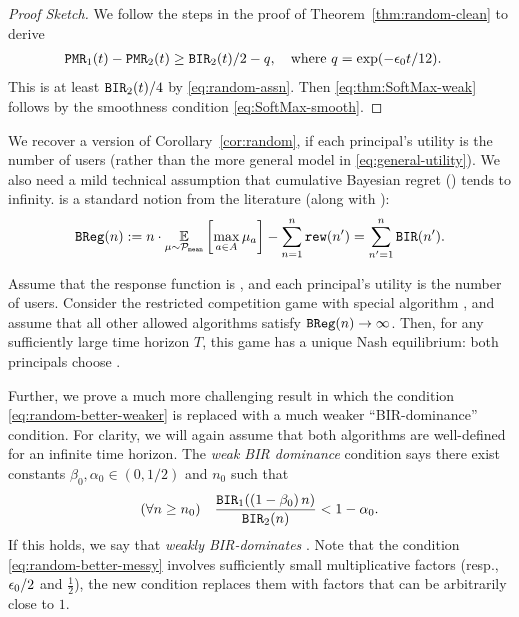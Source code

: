 \begin{proof}[Proof Sketch]
We follow the steps in the proof of Theorem~\ref{thm:random-clean} to derive \begin{align*}
\mathtt{PMR}_1(t) - \mathtt{PMR}_2(t)
    &\geq \mathtt{BIR}_2(t)/2 -q,
    \quad \text{where $q = \exp(-\epsilon_0 t/12)$.}
\end{align*}
This is at least $\mathtt{BIR}_2(t)/4$ by \eqref{eq:random-assn}. Then \eqref{eq:thm:SoftMax-weak} follows by the smoothness condition \eqref{eq:SoftMax-smooth}.
\end{proof}

We recover a version of Corollary~\ref{cor:random}, if each principal's utility is the number of users (rather than the more general model in \eqref{eq:general-utility}). We also need a mild technical assumption that cumulative Bayesian regret (\BReg) tends to infinity. \BReg is a standard notion from the literature (along with \BIR):
\begin{align}\label{eq:SoftMax-BReg}
\BReg(n) := n\cdot \E_{\mu\sim\priorMu}
    \left[ \max_{a\in A} \mu_a\right] - \sum_{n=1}^n \rew(n')
    = \sum_{n'=1}^n \BIR(n').
\end{align}

\begin{corollary}\label{cor:SoftMax}
Assume that the response function is \SoftMaxRandom, and each principal's  utility is the number of users.
%
%
Consider the restricted competition game with special algorithm \alg, and assume that all other allowed algorithms satisfy $\mathtt{BReg}(n)\to \infty$. Then, for any sufficiently large time horizon $T$, this game has a unique Nash equilibrium: both principals choose \alg.
\end{corollary}

Further, we prove a much more challenging result in which the
condition \eqref{eq:random-better-weaker} is replaced with a much
weaker ``BIR-dominance'' condition. For clarity, we will again assume
that both algorithms are well-defined for an infinite time
horizon. The \emph{weak BIR dominance} condition says there exist
constants $\beta_0, \alpha_0\in (0, 1/2)$ and $n_0$ such that
 \begin{align}\label{eq:SoftMax-better}
   (\forall n\geq n_0) \quad
   \frac{\mathtt{BIR}_1((1-\beta_0)\, n)}{\mathtt{BIR}_2(n)} <1-\alpha_0.
 \end{align}
 If this holds, we say that \alg[1] \emph{weakly BIR-dominates}
 \alg[2]. Note that the condition \eqref{eq:random-better-messy}
 involves sufficiently small multiplicative factors (resp., $\epsilon_0/2$
 and $\tfrac12$), the new condition replaces them with factors that
 can be arbitrarily close to $1$.


